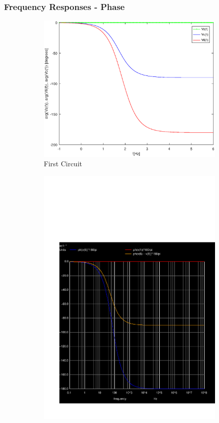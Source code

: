 \subsubsection{Frequency Responses - Phase}

\begin{figure}[h] \centering

\begin{subfigure}{0.4\textwidth}
\includegraphics[width=\textwidth]{Arguments.eps}
\caption{First Circuit}
\label{fig:first}
\end{subfigure}
\begin{subfigure}{0.4\textwidth}
\includegraphics[width=\textwidth]{sim5_ph.pdf}

\end{subfigure}
\end{figure}
